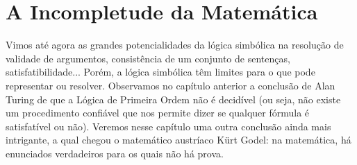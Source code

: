 \chapter{A Incompletude da Matemática}

Vimos até agora as grandes potencialidades da lógica simbólica na resolução de validade de argumentos, consistência de um conjunto de sentenças, satisfatibilidade... Porém, a lógica simbólica têm limites para o que pode representar ou resolver. Observamos no capítulo anterior a conclusão de Alan Turing de que a Lógica de Primeira Ordem não é decidível (ou seja, não existe um procedimento confiável que nos permite dizer se qualquer fórmula é satisfatível ou não). Veremos nesse capítulo uma outra conclusão ainda mais intrigante, a qual chegou o matemático austríaco Kürt Godel: na matemática, há enunciados verdadeiros para os quais não há prova.

